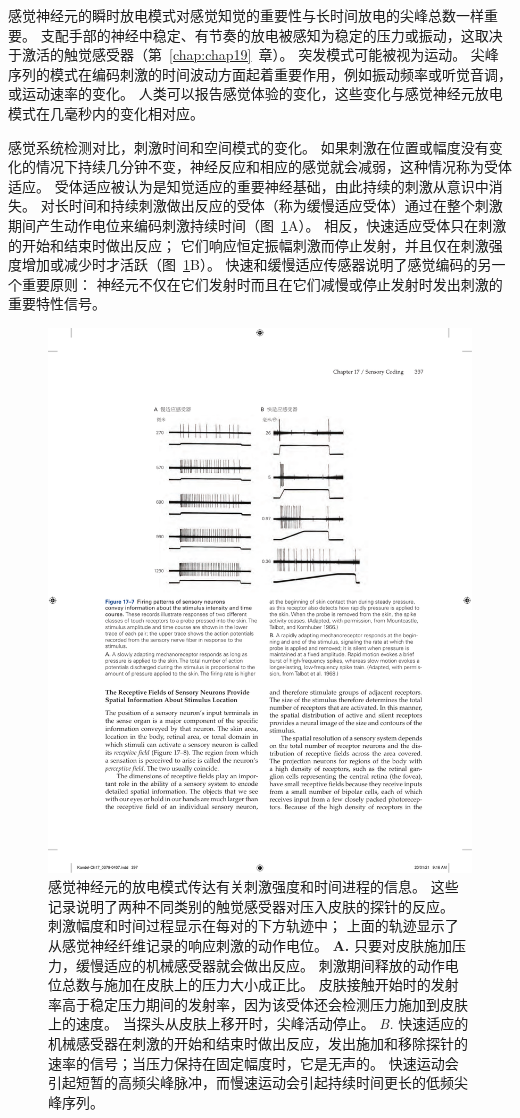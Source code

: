 感觉神经元的瞬时放电模式对感觉知觉的重要性与长时间放电的尖峰总数一样重要。 
支配手部的神经中稳定、有节奏的放电被感知为稳定的压力或振动，这取决于激活的触觉感受器（第~\ref{chap:chap19}~章）。 
突发模式可能被视为运动。 
尖峰序列的模式在编码刺激的时间波动方面起着重要作用，例如振动频率或听觉音调，或运动速率的变化。 
人类可以报告感觉体验的变化，这些变化与感觉神经元放电模式在几毫秒内的变化相对应。


感觉系统检测对比，刺激时间和空间模式的变化。 
如果刺激在位置或幅度没有变化的情况下持续几分钟不变，神经反应和相应的感觉就会减弱，这种情况称为受体适应。 
受体适应被认为是知觉适应的重要神经基础，由此持续的刺激从意识中消失。
对长时间和持续刺激做出反应的受体（称为缓慢适应受体）通过在整个刺激期间产生动作电位来编码刺激持续时间（图~\ref{fig:17_7}A）。 
相反，快速适应受体只在刺激的开始和结束时做出反应； 
它们响应恒定振幅刺激而停止发射，并且仅在刺激强度增加或减少时才活跃（图~\ref{fig:17_7}B）。
快速和缓慢适应传感器说明了感觉编码的另一个重要原则：
神经元不仅在它们发射时而且在它们减慢或停止发射时发出刺激的重要特性信号。


\begin{figure}[htbp]
	\centering
	\includegraphics[width=0.8\linewidth]{chap17/fig_17_7}
	\caption{感觉神经元的放电模式传达有关刺激强度和时间进程的信息。
		这些记录说明了两种不同类别的触觉感受器对压入皮肤的探针的反应。 
		刺激幅度和时间过程显示在每对的下方轨迹中； 
		上面的轨迹显示了从感觉神经纤维记录的响应刺激的动作电位。 
		\textbf{A.} 只要对皮肤施加压力，缓慢适应的机械感受器就会做出反应。 
		刺激期间释放的动作电位总数与施加在皮肤上的压力大小成正比。
		皮肤接触开始时的发射率高于稳定压力期间的发射率，因为该受体还会检测压力施加到皮肤上的速度。 
		当探头从皮肤上移开时，尖峰活动停止\cite{mountcastle1966neural}。
		\textit{B.} 快速适应的机械感受器在刺激的开始和结束时做出反应，发出施加和移除探针的速率的信号；当压力保持在固定幅度时，它是无声的。
		快速运动会引起短暂的高频尖峰脉冲，而慢速运动会引起持续时间更长的低频尖峰序列\cite{talbot1968sense}。}
	\label{fig:17_7}
\end{figure}


